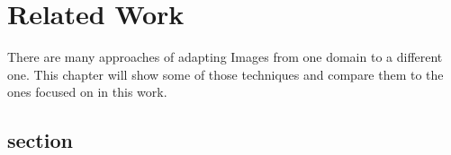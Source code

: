 \chapter{Related Work}
\label{sec:related_work}

There are many approaches of adapting Images from one domain to a different one. This chapter will show some of those techniques and compare them to the ones focused on in this work.

\section{section}